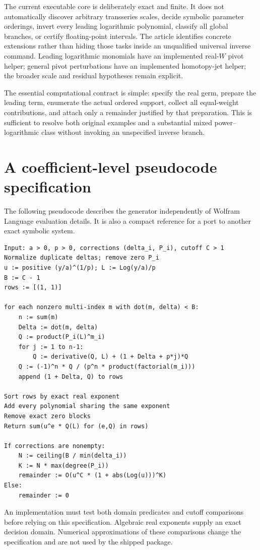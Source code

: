 \documentclass[11pt,a4paper]{article}
\numberwithin{equation}{section}
\theoremstyle{definition}
\theoremstyle{remark}
\begin{document}
The current executable core is deliberately exact and finite. It does not
automatically discover arbitrary transseries scales, decide symbolic
parameter orderings, invert every leading logarithmic polynomial, classify
all global branches, or certify floating-point intervals. The article
identifies concrete extensions rather than hiding those tasks inside an
unqualified universal inverse command. Leading logarithmic monomials have
an implemented real-$W$ pivot helper; general pivot perturbations have an
implemented homotopy-jet helper; the broader scale and residual hypotheses
remain explicit.

The essential computational contract is simple: specify the real germ,
prepare the leading term, enumerate the actual ordered support, collect
all equal-weight contributions, and attach only a remainder justified by
that preparation. This is sufficient to resolve both original examples
and a substantial mixed power--logarithmic class without invoking an
unspecified inverse branch.

\appendix
\section{A coefficient-level pseudocode specification}

The following pseudocode describes the generator independently of Wolfram
Language evaluation details. It is also a compact reference for a port to
another exact symbolic system.
\begin{lstlisting}[language={}]
Input: a > 0, p > 0, corrections (delta_i, P_i), cutoff C > 1
Normalize duplicate deltas; remove zero P_i
u := positive (y/a)^(1/p); L := Log(y/a)/p
B := C - 1
rows := [(1, 1)]

for each nonzero multi-index m with dot(m, delta) < B:
    n := sum(m)
    Delta := dot(m, delta)
    Q := product(P_i(L)^m_i)
    for j := 1 to n-1:
        Q := derivative(Q, L) + (1 + Delta + p*j)*Q
    Q := (-1)^n * Q / (p^n * product(factorial(m_i)))
    append (1 + Delta, Q) to rows

Sort rows by exact real exponent
Add every polynomial sharing the same exponent
Remove exact zero blocks
Return sum(u^e * Q(L) for (e,Q) in rows)

If corrections are nonempty:
    N := ceiling(B / min(delta_i))
    K := N * max(degree(P_i))
    remainder := O(u^C * (1 + abs(Log(u)))^K)
Else:
    remainder := 0
\end{lstlisting}

An implementation must test both domain predicates and cutoff comparisons
before relying on this specification. Algebraic real exponents supply an
exact decision domain. Numerical approximations of these comparisons
change the specification and are not used by the shipped package.
\end{document}
